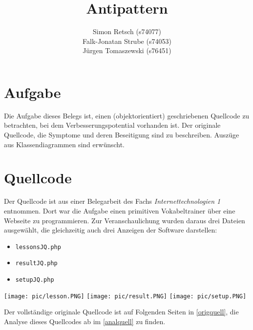 \documentclass{scrartcl}
\title{Antipattern}
\author{Simon Retsch (s74077)\texorpdfstring{\\}{, }
Falk-Jonatan Strube (s74053)\texorpdfstring{\\}{, }
Jürgen Tomaszewski (s76451)}
\begin{document}
\maketitle
\ofoot{}
\tableofcontents

\section{Aufgabe}
Die Aufgabe dieses Belegs ist, einen (objektorientiert) geschriebenen Quellcode zu betrachten, bei dem Verbesserungspotential vorhanden ist. Der originale Quellcode, die Symptome und deren Beseitigung sind zu beschreiben. Auszüge aus Klassendiagrammen sind erwünscht.

\section{Quellcode}
\label{quellcode}
Der Quellcode ist aus einer Belegarbeit des Fachs \emph{Internettechnologien 1} entnommen. Dort war die Aufgabe einen primitiven Vokabeltrainer über eine Webseite zu programmieren. 
Zur Veranschaulichung wurden daraus drei Dateien ausgewählt, die gleichzeitig auch drei Anzeigen der Software darstellen:
\begin{itemize}
\item \lstinline`lessonsJQ.php`
\item \lstinline`resultJQ.php`
\item \lstinline`setupJQ.php`
\end{itemize}
\begin{center}
\texttt{[image: pic/lesson.PNG]}
\texttt{[image: pic/result.PNG]}
\texttt{[image: pic/setup.PNG]}
\end{center}
Der vollständige originale Quellcode ist auf Folgenden Seiten in \autoref{origquell}, die Analyse dieses Quellcodes ab  im \autoref{analquell} zu finden.
\clearpage
\end{document}
